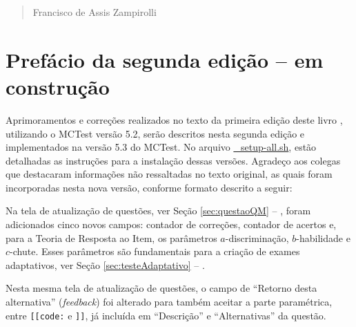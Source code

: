 \begin{verse}
    \vspace*{2mm}
	\begin{flushright}
		Francisco de Assis Zampirolli\\
            \date{7 de setembro de 2023}
	\end{flushright}
\end{verse}

\newpage


\section*{Prefácio da segunda edição -- em construção}

Aprimoramentos e correções realizados no texto da primeira edição deste livro \cite{Zampirolli2023:MCTest}, utilizando o MCTest versão 5.2, serão descritos nesta segunda edição e implementados na versão 5.3 do MCTest. No arquivo \href{https://github.com/fzampirolli/mctest/blob/master/_setup-all.sh}{\_setup-all.sh}, estão detalhadas as instruções para a instalação dessas versões. Agradeço aos colegas que destacaram informações não ressaltadas no texto original, as quais foram incorporadas nesta nova versão, conforme formato descrito a seguir:


Na tela de atualização de questões, ver Seção \ref{sec:questaoQM} -- , foram adicionados cinco novos campos: contador de correções, contador de acertos e, para a Teoria de Resposta ao Item, os parâmetros \(a\)-discriminação, \(b\)-habilidade e \(c\)-chute. Esses parâmetros são fundamentais para a criação de exames adaptativos, ver Seção \ref{sec:testeAdaptativo} -- . 

Nesta mesma tela de atualização de questões, o campo de ``Retorno desta alternativa'' (\textit{feedback}) foi alterado para também aceitar a parte paramétrica, entre \verb|[[code:| e \verb|]]|, já incluída em ``Descrição'' e ``Alternativas'' da questão.


